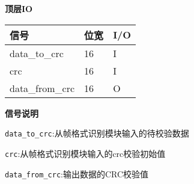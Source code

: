 \documentclass[12pt,]{article}
\begin{document}
\textbf{顶层IO}

\begin{longtable}[]{@{}lll@{}}
\toprule\noalign{}
信号 & 位宽 & I/O \\
\midrule\noalign{}
\endhead
\bottomrule\noalign{}
\endlastfoot
data\_to\_crc & 16 & I \\
crc & 16 & I \\
data\_from\_crc & 16 & O \\
\end{longtable}

\textbf{信号说明}


\texttt{data\_to\_crc}:从帧格式识别模块输入的待校验数据

\texttt{crc}:从帧格式识别模块输入的crc校验初始值

\texttt{data\_from\_crc}:输出数据的CRC校验值
\end{document}
